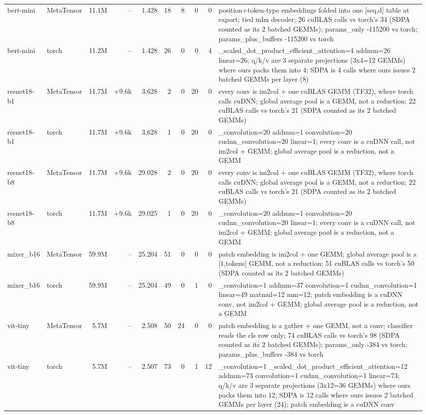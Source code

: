 \begin{tabular}{llrrrrrrrp{}}
bert-mini & MetaTensor & 11.1M & -- & 1.428 & 18 & 8 & 0 & 0 & position+token-type embeddings folded into one [seq,d] table at export; tied mlm decoder; 26 cuBLAS calls vs torch's 34 (SDPA counted as its 2 batched GEMMs); params\_only -115200 vs torch; params\_plus\_buffers -115200 vs torch \\
bert-mini & torch & 11.2M & -- & 1.428 & 26 & 0 & 0 & 4 & \_scaled\_dot\_product\_efficient\_attention=4 addmm=26 linear=26; q/k/v are 3 separate projections (3x4=12 GEMMs) where ours packs them into 4; SDPA is 4 calls where ours issues 2 batched GEMMs per layer (8) \\
resnet18-b1 & MetaTensor & 11.7M & +9.6k & 3.628 & 2 & 0 & 20 & 0 & every conv is im2col + one cuBLAS GEMM (TF32), where torch calls cuDNN; global average pool is a GEMM, not a reduction; 22 cuBLAS calls vs torch's 21 (SDPA counted as its 2 batched GEMMs) \\
resnet18-b1 & torch & 11.7M & +9.6k & 3.628 & 1 & 0 & 20 & 0 & \_convolution=20 addmm=1 convolution=20 cudnn\_convolution=20 linear=1; every conv is a cuDNN call, not im2col + GEMM; global average pool is a reduction, not a GEMM \\
resnet18-b8 & MetaTensor & 11.7M & +9.6k & 29.028 & 2 & 0 & 20 & 0 & every conv is im2col + one cuBLAS GEMM (TF32), where torch calls cuDNN; global average pool is a GEMM, not a reduction; 22 cuBLAS calls vs torch's 21 (SDPA counted as its 2 batched GEMMs) \\
resnet18-b8 & torch & 11.7M & +9.6k & 29.025 & 1 & 0 & 20 & 0 & \_convolution=20 addmm=1 convolution=20 cudnn\_convolution=20 linear=1; every conv is a cuDNN call, not im2col + GEMM; global average pool is a reduction, not a GEMM \\
mixer\_b16 & MetaTensor & 59.9M & -- & 25.204 & 51 & 0 & 0 & 0 & patch embedding is im2col + one GEMM; global average pool is a [1,tokens] GEMM, not a reduction; 51 cuBLAS calls vs torch's 50 (SDPA counted as its 2 batched GEMMs) \\
mixer\_b16 & torch & 59.9M & -- & 25.204 & 49 & 0 & 1 & 0 & \_convolution=1 addmm=37 convolution=1 cudnn\_convolution=1 linear=49 matmul=12 mm=12; patch embedding is a cuDNN conv, not im2col + GEMM; global average pool is a reduction, not a GEMM \\
vit-tiny & MetaTensor & 5.7M & -- & 2.508 & 50 & 24 & 0 & 0 & patch embedding is a gather + one GEMM, not a conv; classifier reads the cls row only; 74 cuBLAS calls vs torch's 98 (SDPA counted as its 2 batched GEMMs); params\_only -384 vs torch; params\_plus\_buffers -384 vs torch \\
vit-tiny & torch & 5.7M & -- & 2.507 & 73 & 0 & 1 & 12 & \_convolution=1 \_scaled\_dot\_product\_efficient\_attention=12 addmm=73 convolution=1 cudnn\_convolution=1 linear=73; q/k/v are 3 separate projections (3x12=36 GEMMs) where ours packs them into 12; SDPA is 12 calls where ours issues 2 batched GEMMs per layer (24); patch embedding is a cuDNN conv \\
\bottomrule
\end{tabular}

